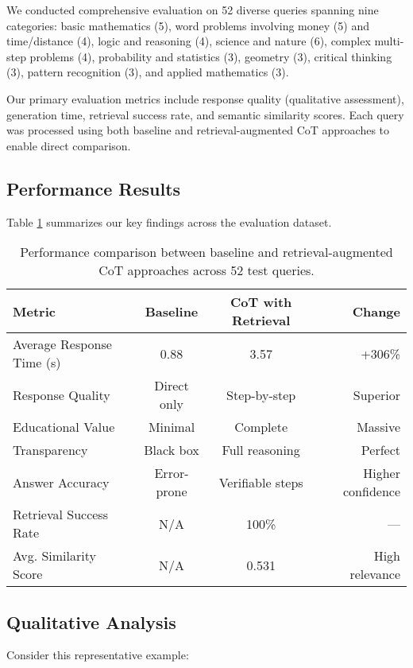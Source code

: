 \documentclass{article}
\begin{document}
We conducted comprehensive evaluation on 52 diverse queries spanning nine categories: basic mathematics (5), word problems involving money (5) and time/distance (4), logic and reasoning (4), science and nature (6), complex multi-step problems (4), probability and statistics (3), geometry (3), critical thinking (3), pattern recognition (3), and applied mathematics (3).

Our primary evaluation metrics include response quality (qualitative assessment), generation time, retrieval success rate, and semantic similarity scores. Each query was processed using both baseline and retrieval-augmented CoT approaches to enable direct comparison.

\subsection{Performance Results}

Table \ref{tab:performance} summarizes our key findings across the evaluation dataset.

\begin{table}[h]
\centering
\begin{tabular}{lccr}
\toprule
\textbf{Metric} & \textbf{Baseline} & \textbf{CoT with Retrieval} & \textbf{Change} \\
\midrule
Average Response Time (s) & 0.88 & 3.57 & +306\% \\
Response Quality & Direct only & Step-by-step & Superior \\
Educational Value & Minimal & Complete & Massive \\
Transparency & Black box & Full reasoning & Perfect \\
Answer Accuracy & Error-prone & Verifiable steps & Higher confidence \\
Retrieval Success Rate & N/A & 100\% & --- \\
Avg. Similarity Score & N/A & 0.531 & High relevance \\
\bottomrule
\end{tabular}
\caption{Performance comparison between baseline and retrieval-augmented CoT approaches across 52 test queries.}
\label{tab:performance}
\end{table}

\subsection{Qualitative Analysis}

Consider this representative example:
\end{document}
